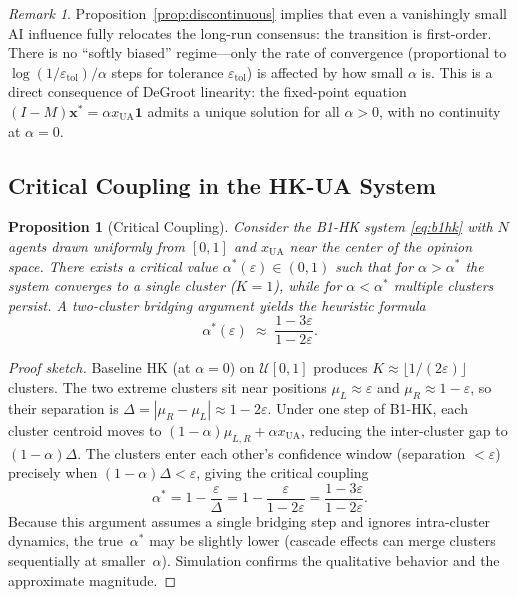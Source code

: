 \documentclass{article}
\theoremstyle{plain}
\newtheorem{proposition}[theorem]{Proposition}
\theoremstyle{definition}
\theoremstyle{remark}
\newtheorem{remark}[theorem]{Remark}
\newcommand{\bx}{\mathbf{x}}
\newcommand{\bone}{\mathbf{1}}
\newcommand{\xUA}{x_{\mathrm{UA}}}
\begin{document}
\begin{remark}
\label{rem:first_order}
Proposition~\ref{prop:discontinuous} implies that even a vanishingly
small AI influence fully relocates the long-run consensus: the transition
is first-order.  There is no ``softly biased'' regime---only the rate of
convergence (proportional to $\log(1/\varepsilon_{\mathrm{tol}})/\alpha$
steps for tolerance $\varepsilon_{\mathrm{tol}}$) is affected by how small
$\alpha$ is.  This is a direct consequence of DeGroot linearity: the
fixed-point equation $(I-M)\bx^*=\alpha\xUA\bone$ admits a unique solution
for all $\alpha>0$, with no continuity at $\alpha=0$.
\end{remark}

\subsection{Critical Coupling in the HK-UA System}

\begin{proposition}[Critical Coupling]
\label{prop:critical}
Consider the B1-HK system \eqref{eq:b1hk} with $N$ agents drawn uniformly
from $[0,1]$ and $\xUA$ near the center of the opinion space.
There exists a critical value $\alpha^*(\varepsilon)\in(0,1)$ such that
for $\alpha>\alpha^*$ the system converges to a single cluster
($K=1$), while for $\alpha<\alpha^*$ multiple clusters persist.
A two-cluster bridging argument yields the heuristic formula
\begin{equation}
    \alpha^*(\varepsilon) \;\approx\; \frac{1-3\varepsilon}{1-2\varepsilon}.
    \label{eq:alphastar}
\end{equation}
\end{proposition}

\begin{proof}[Proof sketch]
Baseline HK (at $\alpha=0$) on $\mathcal{U}[0,1]$ produces
$K\approx\lfloor 1/(2\varepsilon)\rfloor$ clusters.  The two extreme clusters
sit near positions $\mu_L\approx\varepsilon$ and $\mu_R\approx 1-\varepsilon$,
so their separation is $\Delta=|\mu_R-\mu_L|\approx 1-2\varepsilon$.
Under one step of B1-HK, each cluster centroid moves to
$(1-\alpha)\mu_{L,R}+\alpha\xUA$, reducing the inter-cluster gap to
$(1-\alpha)\Delta$.  The clusters enter each other's confidence window
(separation $<\varepsilon$) precisely when $(1-\alpha)\Delta<\varepsilon$,
giving the critical coupling
\[
    \alpha^* = 1 - \frac{\varepsilon}{\Delta} = 1 - \frac{\varepsilon}{1-2\varepsilon}
             = \frac{1-3\varepsilon}{1-2\varepsilon}.
\]
Because this argument assumes a single bridging step and ignores intra-cluster
dynamics, the true~$\alpha^*$ may be slightly lower (cascade effects
can merge clusters sequentially at smaller~$\alpha$).  Simulation confirms
the qualitative behavior and the approximate magnitude.
\end{proof}
\end{document}
